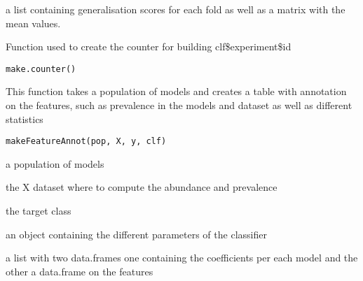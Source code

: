 \documentclass[a4paper]{book}
\begin{document}
%
\begin{Value}
a list containing generalisation scores for each fold as well as a matrix with the mean values.
\end{Value}
%
\begin{Description}
Function used to create the counter for building clf\$experiment\$id
\end{Description}
%
\begin{Usage}
\begin{verbatim}
make.counter()
\end{verbatim}
\end{Usage}
%
\begin{Description}
This function takes a population of models and creates a table with annotation on the features, 
such as prevalence in the models and dataset as well as different statistics
\end{Description}
%
\begin{Usage}
\begin{verbatim}
makeFeatureAnnot(pop, X, y, clf)
\end{verbatim}
\end{Usage}
%
\begin{Arguments}
\begin{ldescription}
\item[\code{pop:}] a population of models

\item[\code{X:}] the X dataset where to compute the abundance and prevalence

\item[\code{y:}] the target class

\item[\code{clf:}] an object containing the different parameters of the classifier
\end{ldescription}
\end{Arguments}
%
\begin{Value}
a list with two data.frames one containing the coefficients per each model and the other a data.frame on the features
\end{Value}
\end{document}
